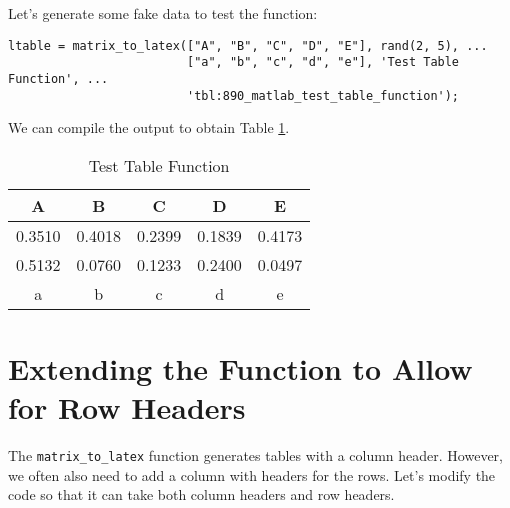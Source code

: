 \documentclass[12pt, a4paper]{article}
\begin{document}
Let's generate some fake data to test the function:
\lstset{language=matlab,label= ,caption= ,captionpos=b,firstnumber=1,numbers=left,style=Matlab-editor}
\begin{lstlisting}
ltable = matrix_to_latex(["A", "B", "C", "D", "E"], rand(2, 5), ...
                         ["a", "b", "c", "d", "e"], 'Test Table Function', ...
                         'tbl:890_matlab_test_table_function');
\end{lstlisting}
We can compile the output to obtain Table \ref{tbl:890_matlab_test_table_function}.
\begin{table}[H]
  \centering
  \begin{tabular}{ccccc}
    A&B&C&D&E\\
    \toprule
    0.3510 &0.4018 &0.2399 &0.1839 &0.4173\\
    0.5132 &0.0760 &0.1233 &0.2400 &0.0497\\
    \midrule
    a&b&c&d&e\\
    \bottomrule
  \end{tabular}
  \caption{Test Table Function}
  \label{tbl:890_matlab_test_table_function}
\end{table}
\section{Extending the Function to Allow for Row Headers}
\label{sec:org499c714}
The \texttt{matrix\_to\_latex} function generates tables with a column header.
However, we often also need to add a column with headers for the rows.
Let's modify the code so that it can take both column headers and row headers.
\end{document}

